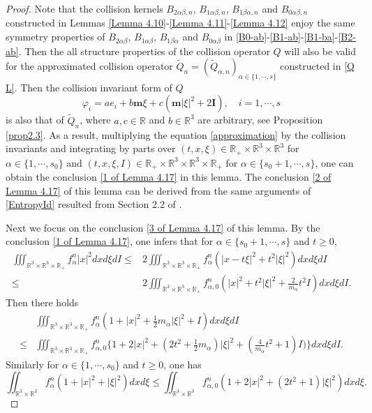 \documentclass[reqno,11pt]{amsart}
\numberwithin{equation}{section}
\def\R{\mathbb{R}}
\begin{document}
\begin{proof}
Note that the collision kernels $B_{2 \alpha \beta ,n}$, $B_{1 \alpha \beta, n}$, $B_{1 \beta \alpha, n}$ and $B_{0 \alpha \beta, n}$ constructed in Lemmas \ref{Lemma 4.10}-\ref{Lemma 4.11}-\ref{Lemma 4.12} enjoy the same symmetry properties of $B_{2 \alpha \beta }$, $B_{1 \alpha \beta}$, $B_{1 \beta \alpha}$ and $B_{0 \alpha \beta}$ in \eqref{B0-ab}-\eqref{B1-ab}-\eqref{B1-ba}-\eqref{B2-ab}. Then the all structure properties of the collision operator $Q$ will also be valid for the approximated collision operator $\tilde{Q}_n = ( \tilde{Q}_{\alpha, n} )_{ \alpha \in \{ 1, \cdots, s \} }$ constructed in \eqref{Q L}. Then the collision invariant form of $Q$
	\begin{equation*}
		\varphi_i= ae_i + b \mathbf{m} \xi +c (\mathbf{m} |\xi|^2+2\mathbf{I}),\quad i=1,\cdots,s 
	\end{equation*}
is also that of $\tilde{Q}_n$, where $a,c\in \R $ and $ b\in \R^3$ are arbitrary, see Proposition \ref{prop2.3}. As a result, multiplying the equation \eqref{approximation} by the collision invariants and integrating by parts over $  (t,x,\xi) \in \R_+ \times \R^3 \times \R^3 $ for $\alpha \in \{ 1, \cdots, s_0 \}$ and $(t,x, \xi, I) \in \R_+ \times \R^3 \times \R^3 \times \R_+$ for $\alpha \in \{ s_0 + 1, \cdots, s \}$, one can obtain the conclusion \eqref{1 of Lemma 4.17} in this lemma. The conclusion \eqref{2 of Lemma 4.17} of this lemma can be derived from the same arguments of \eqref{EntropyId} resulted from Section 2.2 of \cite{N.Bernhoff-2023}.

Next we focus on the conclusion \eqref{3 of Lemma 4.17} of this lemma. By the conclusion \eqref{1 of Lemma 4.17}, one infers that for $\alpha \in \{s_0+1,\cdots,s\}$ and $t \geq 0$,
	\begin{equation*}
		\begin{aligned}
			\iiint_{\R^3 \times \R^3 \times \R_+}f^n_\alpha |x|^2 dxd\xi dI
			\leq & 2\iiint_{\R^3 \times \R^3 \times \R_+}f^n_\alpha (|x-t\xi|^2 + t^2 |\xi|^2) dxd\xi dI \\
\leq & 2\iiint_{\R^3 \times \R^3 \times \R_+}f^n_{\alpha,0} (|x|^2 + t^2 |\xi|^2 + \tfrac{2}{m_\alpha} t^2 I) dxd\xi dI.
		\end{aligned}
	\end{equation*}
	Then there holds
	\begin{equation*}
		\begin{aligned}
			&\iiint_{ \R^3 \times \R^3\times \R_+} f^n_\alpha (1+|x|^2+ \tfrac{1}{2} m_\alpha |\xi|^2 +I)dxd\xi dI \\
			\leq &\iiint_{ \R^3 \times \R^3\times \R_+} f^n_{\alpha,0} \{ 1 + 2 |x|^2 + ( 2 t^2 + \tfrac{1}{2} m_\alpha ) |\xi|^2 + (\tfrac{4}{m_\alpha} t^2 + 1) I )\} dxd\xi dI.
		\end{aligned}
	\end{equation*}
	Similarly for $\alpha \in \{1,\cdots,s_0\}$ and $t \geq 0$, one has
	\begin{equation*}
		\iint_{ \R^3 \times \R^3} f^n_\alpha (1+|x|^2+|\xi|^2) dxd\xi \leq \iint_{ \R^3 \times \R^3} f^n_{\alpha,0} (1+2|x|^2+(2t^2+1)|\xi|^2) dxd\xi .
	\end{equation*}


\end{proof}
\end{document}
